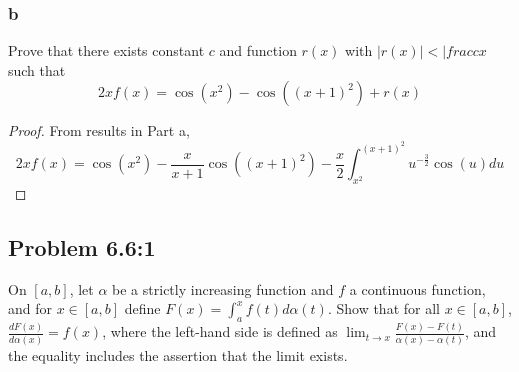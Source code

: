 \documentclass{amsart}
\begin{document}
\subsubsection*{b}
Prove that there exists constant $c$ and function $r(x)$ with $|r(x)| < |frac{c}{x}$ such that
\[
2xf(x) = \cos(x^2) - \cos((x+1)^2) + r(x)
\]

\begin{proof}
From results in Part a,
\[
2xf(x) = \cos(x^2) - \frac{x}{x+1}\cos((x+1)^2)
- \frac{x}{2} \int_{x^2}^{(x+1)^2} u^{-\frac{3}{2}} \cos(u)du
\]

\end{proof}

\subsection*{Problem 6.6:1}

On $[a, b]$, let $\alpha$ be a strictly increasing function and $f$ a continuous function, and for $x \in [a, b]$ define $F(x) = \int_a^x f(t) d\alpha(t)$. Show that for all $x \in [a, b]$, $\frac{dF(x)}{d \alpha(x)} = f(x)$, where the left-hand side is defined as $\lim_{t \to x} \frac{F(x) - F(t)}{\alpha(x) - \alpha(t)}$, and the equality includes the assertion that the limit exists.
\end{document}
